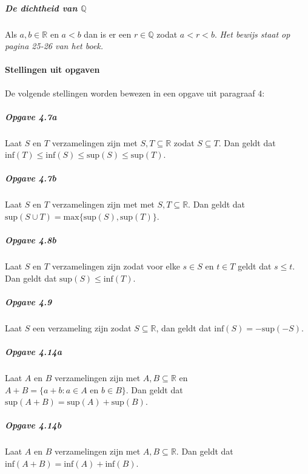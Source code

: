 \subparagraph{De dichtheid van $\mathbb{Q}$} Als $a,b\in\mathbb{R}$ en $a<b$ dan is er een $r\in\mathbb{Q}$ zodat $a<r<b$. \textit{Het bewijs staat op pagina 25-26 van het boek.}

\paragraph{Stellingen uit opgaven} De volgende stellingen worden bewezen in een opgave uit paragraaf $4$:

\subparagraph{Opgave 4.7a} Laat $S$ en $T$ verzamelingen zijn met $S,T\subseteq\mathbb{R}$ zodat $S \subseteq T$. Dan geldt dat $\text{inf}(T)\leq\text{inf}(S)\leq\text{sup}(S)\leq\text{sup}(T)$.

\subparagraph{Opgave 4.7b} Laat $S$ en $T$ verzamelingen zijn met met $S,T\subseteq\mathbb{R}$. Dan geldt dat $\text{sup}(S \cup T) = \text{max}\{\text{sup}(S), \text{sup}(T)\}$.

\subparagraph{Opgave 4.8b} Laat $S$ en $T$ verzamelingen zijn zodat voor elke $s \in S$ en $t \in T$ geldt dat $s \leq t$. Dan geldt dat $\text{sup}(S)\leq\text{inf}(T)$.

\subparagraph{Opgave 4.9} Laat $S$ een verzameling zijn zodat $S\subseteq\mathbb{R}$, dan geldt dat $\text{inf}(S)=-\text{sup}(-S)$.

\subparagraph{Opgave 4.14a} Laat $A$ en $B$ verzamelingen zijn met $A,B\subseteq\mathbb{R}$ en $A+B=\{a+b:a \in A \text{ en } b \in B\}$. Dan geldt dat $\text{sup}(A+B)=\text{sup}(A)+\text{sup}(B)$.

\subparagraph{Opgave 4.14b} Laat $A$ en $B$ verzamelingen zijn met $A,B\subseteq\mathbb{R}$. Dan geldt dat $\text{inf}(A+B)=\text{inf}(A)+\text{inf}(B)$.
